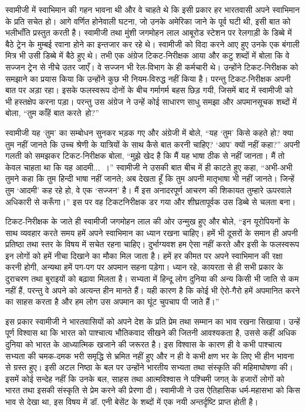 \delimiter

स्वामीजी में स्वाभिमान की गहन भावना थी और वे चाहते थे कि इसी प्रकार हर भारतवासी अपने स्वाभिमान के प्रति सचेत हो। आगे वर्णित होनेवाली घटना, जो उनके अमेरिका जाने के पूर्व घटी थी, इसी बात को भलीभाँति प्रस्तुत करती है। स्वामीजी तथा मुंशी जगमोहन लाल आबूरोड स्टेशन पर रेलगाड़ी के डिब्बे में बैठे ट्रेन के मुम्बई रवाना होने का इन्तजार कर रहे थे। स्वामीजी को विदा करने आए हुए उनके एक बंगाली मित्र भी उसी डिब्बे में बैठे हुए थे। तभी एक अंग्रेज टिकट-निरीक्षक आया और कटु शब्दों में बोला कि वे सज्जन ट्रेन से नीचे उतर जाएँ। वे सज्जन भी रेल-विभाग के ही कर्मचारी थे। उन्होंने टिकट-निरीक्षक को समझाने का प्रयास किया कि उन्होंने कुछ भी नियम-विरुद्ध नहीं किया है। परन्तु टिकट-निरीक्षक अपनी बात पर अड़ा रहा। इसके फलस्वरूप दोनों के बीच गर्मागर्म बहस छिड़ गयी, जिसमें बाद में स्वामीजी को भी हस्तक्षेप करना पड़ा। परन्तु उस अंग्रेज ने उन्हें कोई साधारण साधु समझा और अपमानसूचक शब्दों में बोला, “तुम काँहें बात करते~हो?” 

स्वामीजी यह ‘तुम’ का सम्बोधन सुनकर भड़क गए और अंग्रेजी में बोले, “यह ‘तुम’ किसे कहते हो? क्या तुम नहीं जानते कि उच्च श्रेणी के यात्रियों के साथ कैसे बात करनी चाहिए? ‘आप’ क्यों नहीं कहा?” अपनी गलती को समझकर टिकट-निरीक्षक बोला, “मुझे खेद है कि मैं यह भाषा ठीक से नहीं जानता। मैं तो केवल चाहता था कि यह आदमी...~।” स्वामीजी ने उसकी बात बीच में ही काटते हुए कहा, “अभी-अभी तुमने कहा कि तुम हिन्दी भाषा नहीं जानते; अब देखता हूँ कि तुम अपनी मातृभाषा भी नहीं जानते। जिन्हें तुम ‘आदमी’ कह रहे हो, वे एक ‘सज्जन’ है। मैं इस अनादरपूर्ण आचरण की शिकायत तुम्हारे ऊपरवाले अधिकारी से करूँगा।” इस पर वह टिकटनिरीक्षक डर गया और शीघ्रतापूर्वक उस डिब्बे से चलता बना। 

टिकट-निरीक्षक के जाते ही स्वामीजी जगमोहन लाल की ओर उन्मुख हुए और बोले, “इन यूरोपियनों के साथ व्यवहार करते समय हमें अपने स्वाभिमान का ध्यान रखना चाहिए। हमें भी दूसरों के समान ही अपनी प्रतिष्ठा तथा स्तर के विषय में सचेत रहना चाहिए। दुर्भाग्यवश हम ऐसा नहीं करते और इसी के फलस्वरूप इन लोगों को हमें नीचा दिखाने का मौका मिल जाता है। हमें हर कीमत पर अपने स्वाभिमान की रक्षा करनी होगी, अन्यथा हमें पग-पग पर अपमान सहना पड़ेगा। ध्यान रहे, कायरता से ही सभी प्रकार के दुराचरण तथा बुराइयों को बढ़ावा मिलता है। सभ्यता में हिन्दू लोग दुनिया की अन्य किसी भी जाति से कम नहीं हैं, परन्तु वे अपने को अत्यन्त हीन मानते हैं। यही कारण है कि कोई भी ऐरो-गैरो हमें अपमानित करने का साहस करता है और हम लोग उस अपमान का घूंट चुपचाप पी जाते हैं।” 

इस प्रकार स्वामीजी ने भारतवासियों को अपने देश के प्रति प्रेम तथा सम्मान का भाव रखना सिखाया। उन्हें पूर्ण विश्वास था कि भारत को पाश्चात्य भौतिकवाद सीखने की जितनी आवश्यकता है, उससे कहीं अधिक दुनिया को भारत के आध्यात्मिक खजाने की जरूरत है। इस विश्वास के कारण ही वे कभी पाश्चात्य सभ्यता की चमक-दमक भरी समृद्धि से भ्रमित नहीं हुए और न ही वे कभी क्षण भर के लिए भी हीन भावना से ग्रस्त हुए। इसी अटल निष्ठा के बल पर उन्होंने भारतीय सभ्यता तथा संस्कृति की महिमाघोषणा की। इसमें कोई सन्देह नहीं कि उनके बल, साहस तथा आत्मविश्वास ने पश्चिमी जगत् के हजारों लोगों को भारत तथा इसकी संस्कृति से प्रेम करने की प्रेरणा दी। स्वामीजी ने उस ऐतिहासिक धर्म-महासभा को किस भाव से देखा था, इस विषय में डॉ. एनी बेसेंट के शब्दों में एक नयी अन्तर्दृष्टि प्राप्त होती है। 

